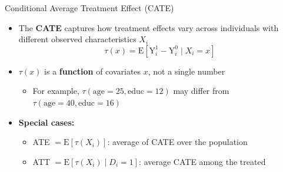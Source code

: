 \documentclass[dvipsnames,hyperref={pdfpagelabels=false}]{beamer}
\begin{document}
\begin{frame}{Conditional Average Treatment Effect (CATE)}
	\begin{itemize}
		\item The \textbf{CATE} captures how treatment effects vary across individuals with different observed characteristics $X_i$
		\begin{equation*}
			\tau(x) = \mathrm{E}[\mathrm{Y}^{1}_{i} - \mathrm{Y}^{0}_{i} \mid X_{i} = x]
		\end{equation*}
		\vspace{0.2cm}
		\item $\tau(x)$ is a \textbf{function} of covariates $x$, not a single number
		\vspace{0.2cm}
		\begin{itemize}
			\item For example, $\tau(\text{age}=25, \text{educ}=12)$ may differ from $\tau(\text{age}=40, \text{educ}=16)$
		\end{itemize}
		\vspace{0.3cm}
		\item \textbf{Special cases:}
		\vspace{0.2cm}
		\begin{itemize}
			\item ATE $= \mathrm{E}[\tau(X_i)]$: average of CATE over the population
			\vspace{0.2cm}
			\item ATT $= \mathrm{E}[\tau(X_i) \mid D_i = 1]$: average CATE among the treated
		\end{itemize}
	\end{itemize}
\end{frame}
\end{document}
